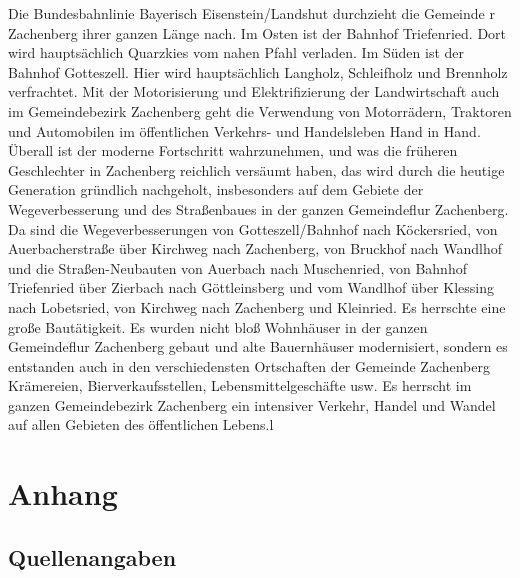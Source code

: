 \documentclass[12pt,a4pager]{book}
\begin{document}
Die Bundesbahnlinie Bayerisch Eisenstein/Landshut durchzieht die Gemeinde r
Zachenberg ihrer ganzen Länge nach. Im Osten ist der Bahnhof Triefenried. Dort
wird hauptsächlich Quarzkies vom nahen Pfahl verladen. Im Süden ist der Bahnhof
Gotteszell. Hier wird hauptsächlich Langholz, Schleifholz und Brennholz
verfrachtet. Mit der Motorisierung und Elektrifizierung der Landwirtschaft auch
im Gemeindebezirk Zachenberg geht die Verwendung von Motorrädern, Traktoren und
Automobilen im öffentlichen Verkehrs- und Handelsleben Hand in Hand. Überall ist
der moderne Fortschritt wahrzunehmen, und was die früheren Geschlechter in
Zachenberg reichlich versäumt haben, das wird durch die heutige Generation
gründlich nachgeholt, insbesonders auf dem Gebiete der Wegeverbesserung und des
Straßenbaues in der ganzen Gemeindeflur Zachenberg. Da sind die
Wegeverbesserungen von Gotteszell/Bahnhof nach Köckersried, von Auerbacherstraße
über Kirchweg nach Zachenberg, von Bruckhof nach Wandlhof und die
Straßen-Neubauten von Auerbach nach Muschenried, von Bahnhof Triefenried über
Zierbach nach Göttleinsberg und vom Wandlhof über Klessing nach Lobetsried, von
Kirchweg nach Zachenberg und Kleinried. Es herrschte eine große Bautätigkeit. Es
wurden nicht bloß Wohnhäuser in der ganzen Gemeindeflur Zachenberg gebaut und
alte Bauernhäuser modernisiert, sondern es entstanden auch in den
verschiedensten Ortschaften der Gemeinde Zachenberg Krämereien,
Bierverkaufsstellen, Lebensmittelgeschäfte usw. Es herrscht im ganzen
Gemeindebezirk Zachenberg ein intensiver Verkehr, Handel und Wandel auf allen
Gebieten des öffentlichen Lebens.l

\part{Anhang}

\chapter{Quellenangaben}
\end{document}
